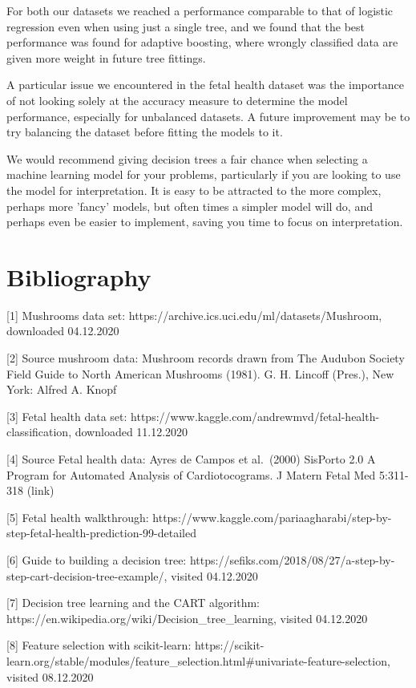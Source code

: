 \documentclass[11pt]{article}
\begin{document}
For both our datasets we reached a performance comparable to that of logistic regression even when using just a single tree, and we found that the best performance was found for adaptive boosting, where wrongly classified data are given more weight in future tree fittings.

A particular issue we encountered in the fetal health dataset was the importance of not looking solely at the accuracy measure to determine the model performance, especially for unbalanced datasets. A future improvement may be to try balancing the dataset before fitting the models to it.

We would recommend giving decision trees a fair chance when selecting a machine learning model for your problems, particularly if you are looking to use the model for interpretation. It is easy to be attracted to the more complex, perhaps more 'fancy' models, but often times a simpler model will do, and perhaps even be easier to implement, saving you time to focus on interpretation.


    \hypertarget{bibliography}{%
\section{Bibliography}\label{bibliography}}

{[}1{]} Mushrooms data set:
https://archive.ics.uci.edu/ml/datasets/Mushroom, downloaded 04.12.2020

{[}2{]} Source mushroom data: Mushroom records drawn from The Audubon
Society Field Guide to North American Mushrooms (1981). G. H. Lincoff
(Pres.), New York: Alfred A. Knopf

{[}3{]} Fetal health data set:
https://www.kaggle.com/andrewmvd/fetal-health-classification, downloaded
11.12.2020

{[}4{]} Source Fetal health data: Ayres de Campos et al.~(2000) SisPorto
2.0 A Program for Automated Analysis of Cardiotocograms. J Matern Fetal
Med 5:311-318 (link)

{[}5{]} Fetal health walkthrough:
https://www.kaggle.com/pariaagharabi/step-by-step-fetal-health-prediction-99-detailed

{[}6{]} Guide to building a decision tree:
https://sefiks.com/2018/08/27/a-step-by-step-cart-decision-tree-example/,
visited 04.12.2020

{[}7{]} Decision tree learning and the CART algorithm:
https://en.wikipedia.org/wiki/Decision\_tree\_learning, visited
04.12.2020

{[}8{]} Feature selection with scikit-learn:
https://scikit-learn.org/stable/modules/feature\_selection.html\#univariate-feature-selection,
visited 08.12.2020
\end{document}
